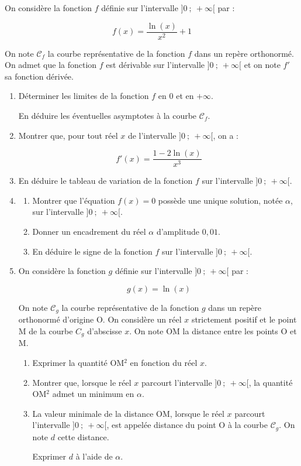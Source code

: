 On considère la fonction $f$ définie sur l'intervalle $]0~;~+\infty[$ par :

\[f(x) = \dfrac{\ln (x)}{x^{2}} + 1\]

On note $\mathcal{C}_{f}$ la courbe représentative de la fonction $f$ dans un repère orthonormé. On admet que la fonction $f$ est dérivable sur l'intervalle $]0~;~ +\infty[$ et on note $f'$ sa fonction dérivée.

\medskip

\begin{enumerate}
\item Déterminer les limites de la fonction $f$ en $0$ et en $+\infty$.

En déduire les éventuelles asymptotes à la courbe $\mathcal{C}_{f}$.
\item Montrer que, pour tout réel $x$ de l'intervalle $]0~;~ +\infty[$, on a :

\[f'(x) = \dfrac{1 - 2\ln(x)}{x^{3}}\]

\item En déduire le tableau de variation de la fonction $f$ sur l'intervalle $]0~;~ +\infty[$.

\item 
	\begin{enumerate}
		\item Montrer que l'équation $f(x) = 0$ possède une unique solution, notée $\alpha$, sur l'intervalle $]0~;~ +\infty[$.
		\item Donner un encadrement du réel $\alpha$ d'amplitude $0,01$.
		\item En déduire le signe de la fonction $f$ sur l'intervalle $]0~;~ +\infty[$.
	\end{enumerate}
\item On considère la fonction $g$ définie sur l'intervalle $]0~;~ +\infty[$ par :

\[g(x) = \ln(x)\]

On note $\mathcal{C}_{g}$ la courbe représentative de la fonction $g$ dans un repère orthonormé d'origine O. On considère un réel $x$ strictement positif et le point M de la courbe $C_{g}$ d'abscisse $x$. On note OM la distance entre les points O et M.

	\begin{enumerate}
		\item Exprimer la quantité OM$^{2}$ en fonction du réel $x$.
		\item Montrer que, lorsque le réel $x$ parcourt l'intervalle $]0~;~ +\infty[$, la quantité OM$^{2}$ admet un minimum en $\alpha$.
		\item La valeur minimale de la distance OM, lorsque le réel $x$ parcourt l'intervalle $]0~;~+\infty[$, est appelée distance du point O à la courbe $\mathcal{C}_{g}$. On note $d$ cette distance.

Exprimer $d$ à l'aide de $\alpha$.
	\end{enumerate}
\end{enumerate}
